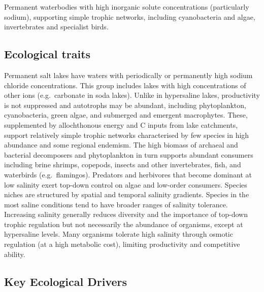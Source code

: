 \documentclass[
  letterpaper,
  DIV=11,
  numbers=noendperiod]{scrartcl}
\begin{document}
Permanent waterbodies with high inorganic solute concentrations
(particularly sodium), supporting simple trophic networks, including
cyanobacteria and algae, invertebrates and specialist birds.

\subsection{Ecological traits}\label{ecological-traits-13}

Permanent salt lakes have waters with periodically or permanently high
sodium chloride concentrations. This group includes lakes with high
concentrations of other ions (e.g.~carbonate in soda lakes). Unlike in
hypersaline lakes, productivity is not suppressed and autotrophs may be
abundant, including phytoplankton, cyanobacteria, green algae, and
submerged and emergent macrophytes. These, supplemented by allochthonous
energy and C inputs from lake catchments, support relatively simple
trophic networks characterised by few species in high abundance and some
regional endemism. The high biomass of archaeal and bacterial
decomposers and phytoplankton in turn supports abundant consumers
including brine shrimps, copepods, insects and other invertebrates,
fish, and waterbirds (e.g.~flamingos). Predators and herbivores that
become dominant at low salinity exert top-down control on algae and
low-order consumers. Species niches are structured by spatial and
temporal salinity gradients. Species in the most saline conditions tend
to have broader ranges of salinity tolerance. Increasing salinity
generally reduces diversity and the importance of top-down trophic
regulation but not necessarily the abundance of organisms, except at
hypersaline levels. Many organisms tolerate high salinity through
osmotic regulation (at a high metabolic cost), limiting productivity and
competitive ability.

\subsection{Key Ecological Drivers}\label{key-ecological-drivers-13}
\end{document}
